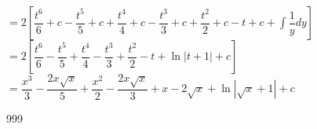 \documentclass[a4paper]{article}
\newcommand{\Lv}{\left[} %
\newcommand{\Rv}{\right]}
\newcommand{\intgrl}{\displaystyle\int} %
\begin{document}
$= 2 \Lv \dfrac{t^6}{6} +c - \dfrac{t^5}{5} +c + \dfrac{t^4}{4} +c - \dfrac{t^3}{3} +c + \dfrac{t^2}{2} +c - t +c + \intgrl \dfrac{1}{y} dy \Rv$\\

$= 2 \Lv \dfrac{t^6}{6} - \dfrac{t^5}{5} + \dfrac{t^4}{4} - \dfrac{t^3}{3} + \dfrac{t^2}{2} - t + \ln |t+1| +c \Rv$\\

$= \dfrac{x^3}{3} - \dfrac{2x \sqrt{x}}{5} + \dfrac{x^2}{2} - \dfrac{2x \sqrt{x}}{3} +x -2 \sqrt{x} + \ln |\sqrt{x} +1| +c$\\

\begin{thebibliography}{999}
\end{thebibliography}
\end{document}
